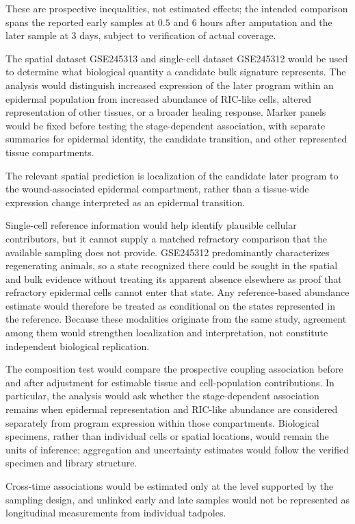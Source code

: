 \documentclass[11pt]{article}
\begin{document}
These are prospective inequalities, not estimated effects; the intended comparison spans the reported early samples at $0.5$ and $6$ hours after amputation and the later sample at $3$ days, subject to verification of actual coverage.

The spatial dataset GSE245313 and single-cell dataset GSE245312 would be used to determine what biological quantity a candidate bulk signature represents. The analysis would distinguish increased expression of the later program within an epidermal population from increased abundance of RIC-like cells, altered representation of other tissues, or a broader healing response. Marker panels would be fixed before testing the stage-dependent association, with separate summaries for epidermal identity, the candidate transition, and other represented tissue compartments.

The relevant spatial prediction is localization of the candidate later program to the wound-associated epidermal compartment, rather than a tissue-wide expression change interpreted as an epidermal transition.

Single-cell reference information would help identify plausible cellular contributors, but it cannot supply a matched refractory comparison that the available sampling does not provide. GSE245312 predominantly characterizes regenerating animals, so a state recognized there could be sought in the spatial and bulk evidence without treating its apparent absence elsewhere as proof that refractory epidermal cells cannot enter that state. Any reference-based abundance estimate would therefore be treated as conditional on the states represented in the reference. Because these modalities originate from the same study, agreement among them would strengthen localization and interpretation, not constitute independent biological replication.

The composition test would compare the prospective coupling association before and after adjustment for estimable tissue and cell-population contributions. In particular, the analysis would ask whether the stage-dependent association remains when epidermal representation and RIC-like abundance are considered separately from program expression within those compartments. Biological specimens, rather than individual cells or spatial locations, would remain the units of inference; aggregation and uncertainty estimates would follow the verified specimen and library structure.

Cross-time associations would be estimated only at the level supported by the sampling design, and unlinked early and late samples would not be represented as longitudinal measurements from individual tadpoles.
\end{document}
